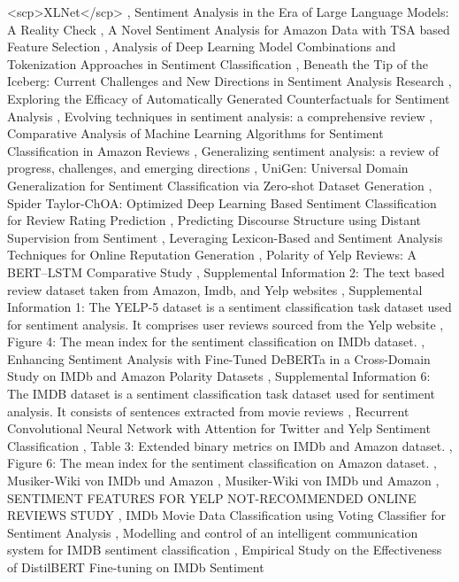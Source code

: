 \documentclass{article}
\begin{document}
<scp>XLNet</scp> \cite{areshey2024exploring4f38bf39}, Sentiment Analysis in the Era of Large Language Models: A Reality Check \cite{zhang2023sentimentb4b66e57}, A Novel Sentiment Analysis for Amazon Data with TSA based Feature Selection \cite{daniel2021novel127fb151}, Analysis of Deep Learning Model Combinations and Tokenization Approaches in Sentiment Classification \cite{erkan2023analysis6633bdc1}, Beneath the Tip of the Iceberg: Current Challenges and New Directions in Sentiment Analysis Research \cite{poria2020beneath22cf40d2}, Exploring the Efficacy of Automatically Generated Counterfactuals for Sentiment Analysis \cite{yang2021exploring1e053e64}, Evolving techniques in sentiment analysis: a comprehensive review \cite{kumar2025evolving5a044b19}, Comparative Analysis of Machine Learning Algorithms for Sentiment Classification in Amazon Reviews \cite{yu2024comparative4e50d20b}, Generalizing sentiment analysis: a review of progress, challenges, and emerging directions \cite{alahmadi2025generalizing369ede0a}, UniGen: Universal Domain Generalization for Sentiment Classification via Zero-shot Dataset Generation \cite{choi2024unigen4fb2ffdf}, Spider Taylor-ChOA: Optimized Deep Learning Based Sentiment Classification for Review Rating Prediction \cite{banbhrani2022spiderd7fe2b64}, Predicting Discourse Structure using Distant Supervision from Sentiment \cite{huber2019predictingfa36d1ac}, Leveraging Lexicon-Based and Sentiment Analysis Techniques for Online Reputation Generation \cite{boumhidi2021leveraging6c43877c}, Polarity of Yelp Reviews: A BERT–LSTM Comparative Study \cite{belaroussi2025polarity26a67026}, Supplemental Information 2: The text based review dataset taken from Amazon, Imdb, and Yelp websites \cite{paperndsupplementald5b276ae}, Supplemental Information 1: The YELP-5 dataset is a sentiment classification task dataset used for sentiment analysis. It comprises user reviews sourced from the Yelp website \cite{paperndsupplemental8b6472a3}, Figure 4: The mean index for the sentiment classification on IMDb dataset. \cite{paperndfigure92a99ba4}, Enhancing Sentiment Analysis with Fine-Tuned DeBERTa in a Cross-Domain Study on IMDb and Amazon Polarity Datasets \cite{cao2025enhancing52f2345f}, Supplemental Information 6: The IMDB dataset is a sentiment classification task dataset used for sentiment analysis. It consists of sentences extracted from movie reviews \cite{paperndsupplementale2a50a6f}, Recurrent Convolutional Neural Network with Attention for Twitter and Yelp Sentiment Classification \cite{wen2018recurrent306cb42f}, Table 3: Extended binary metrics on IMDb and Amazon dataset. \cite{paperndtableaaf66ed6}, Figure 6: The mean index for the sentiment classification on Amazon dataset. \cite{paperndfigure967211c9}, Musiker-Wiki von IMDb und Amazon \cite{gehring2008musikerwikice99da7d}, Musiker-Wiki von IMDb und Amazon \cite{gehring2008musikerwiki92fe96c0}, SENTIMENT FEATURES FOR YELP NOT-RECOMMENDED ONLINE REVIEWS STUDY \cite{lindsentiment6c9bc9d6}, IMDb Movie Data Classification using Voting Classifier for Sentiment Analysis \cite{kaushik2022imdb7b5a4856}, Modelling and control of an intelligent communication system for IMDB sentiment classification \cite{yang2025modelling8e1aaa88}, Empirical Study on the Effectiveness of DistilBERT Fine-tuning on IMDb Sentiment 
\end{document}
